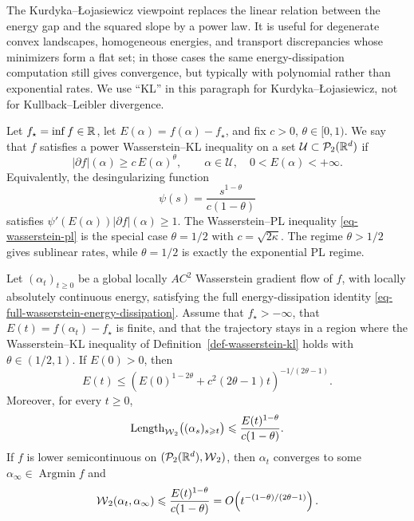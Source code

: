 The Kurdyka--{\L}ojasiewicz viewpoint replaces the linear relation between the energy gap and the squared slope by a power law. It is useful for degenerate convex landscapes, homogeneous energies, and transport discrepancies whose minimizers form a flat set; in those cases the same energy-dissipation computation still gives convergence, but typically with polynomial rather than exponential rates. We use ``KL'' in this paragraph for Kurdyka--{\L}ojasiewicz, not for Kullback--Leibler divergence.

\begin{defn}\label{def-wasserstein-kl}
	Let \(f_\star=\inf f\in\mathbb{R}\), let \(E(\alpha)=f(\alpha)-f_\star\), and fix \(c>0\), \(\theta\in[0,1)\). We say that \(f\) satisfies a power Wasserstein--KL inequality on a set \(\mathcal U\subset \mathcal{P}_2(\mathbb{R}^d)\) if
	\[
		|\partial f|(\alpha)
		\geq
		c\,E(\alpha)^\theta,
		\qquad
		\alpha\in\mathcal U,
		\quad
		0<E(\alpha)<+\infty.
	\]
	Equivalently, the desingularizing function
	\[
		\psi(s)=\frac{s^{1-\theta}}{c(1-\theta)}
	\]
	satisfies \(\psi'(E(\alpha))|\partial f|(\alpha)\geq 1\). The Wasserstein--PL inequality \eqref{eq-wasserstein-pl} is the special case \(\theta=1/2\) with \(c=\sqrt{2\kappa}\). The regime \(\theta>1/2\) gives sublinear rates, while \(\theta=1/2\) is exactly the exponential PL regime.
\end{defn}

\begin{thm}\label{thm-wasserstein-kl-sublinear}
	Let \((\alpha_t)_{t\geq0}\) be a global locally $AC^2$ Wasserstein gradient flow of \(f\), with locally absolutely continuous energy, satisfying the full energy-dissipation identity \eqref{eq-full-wasserstein-energy-dissipation}. Assume that \(f_\star> -\infty\), that \(E(t)=f(\alpha_t)-f_\star\) is finite, and that the trajectory stays in a region where the Wasserstein--KL inequality of Definition~\ref{def-wasserstein-kl} holds with \(\theta\in(1/2,1)\). If \(E(0)>0\), then
	\[
		E(t)
		\leq
		\left(E(0)^{1-2\theta}+c^2(2\theta-1)t\right)^{-1/(2\theta-1)}.
	\]
	Moreover, for every \(t\geq0\),
	\[
		\operatorname{Length}_{\operatorname{\mathcal{W}}_2}\bigl((\alpha_s)_{s\geqslant t}\bigr)
		\leqslant
		\frac{E(t)^{1-\theta}}{c(1-\theta)}.
	\]
	If \(f\) is lower semicontinuous on \((\mathcal{P}_2(\mathbb{R}^d),\operatorname{\mathcal{W}}_2)\), then \(\alpha_t\) converges to some \(\alpha_\infty\in\operatorname{Argmin}f\) and
	\[
		\operatorname{\mathcal{W}}_2(\alpha_t,\alpha_\infty)
		\leqslant
		\frac{E(t)^{1-\theta}}{c(1-\theta)}
		=
		O\!\left(t^{-(1-\theta)/(2\theta-1)}\right).
	\]
\end{thm}


